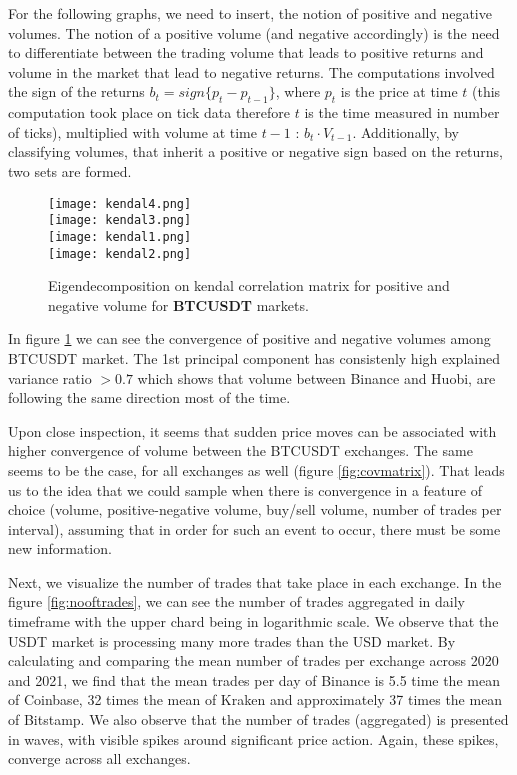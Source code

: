 For the following graphs, we need to insert, the notion of positive and negative volumes. The notion of a positive volume (and negative accordingly) is the need to differentiate between the trading volume that leads to positive returns and volume in the market that lead to negative returns. The computations involved the sign of the returns \(b_t = sign\{p_t - p_{t-1}\}\), where \(p_t\) is the price at time \(t\) (this computation took place on tick data therefore \(t\) is the time measured in number of ticks), multiplied with volume at time \(t-1\) : \(b_t \cdot V_{t-1}\). Additionally, by classifying volumes, that inherit a positive or negative sign based on the returns, two sets are formed. 

\begin{figure}[H]
	\centering
    \texttt{[image: kendal4.png]} \\
    \texttt{[image: kendal3.png]} \\ 
    \texttt{[image: kendal1.png]} \\
    \texttt{[image: kendal2.png]} \\
	\caption{Eigendecomposition on kendal correlation matrix for positive and negative volume for \textbf{BTCUSDT} markets.}
    \label{fig:pcakendall}
\end{figure}

In figure \ref{fig:pcakendall} we can see the convergence of positive and negative volumes among BTCUSDT market. The 1st principal component has consistenly high explained variance ratio \( > 0.7 \) which shows that volume between Binance and Huobi, are following the same direction most of the time.

Upon close inspection, it seems that sudden price moves can be associated with higher convergence of volume between the BTCUSDT exchanges. The same seems to be the case, for all exchanges as well (figure \ref{fig:covmatrix}). That leads us to the idea that we could sample when there is convergence in a feature of choice (volume, positive-negative volume, buy/sell volume, number of trades per interval), assuming that in order for such an event to occur, there must be some new information. 

Next, we visualize the number of trades that take place in each exchange. In the figure \ref{fig:nooftrades}, we can see the number of trades aggregated in daily timeframe with the upper chard being in logarithmic scale. We observe that the USDT market is processing many more trades than the USD market. By calculating and comparing the mean number of trades per exchange across 2020 and 2021, we find that the mean trades per day of Binance is 5.5 time the mean of Coinbase, 32 times the mean of Kraken and approximately 37 times the mean of Bitstamp. We also observe that the number of trades (aggregated) is presented in waves, with visible spikes around significant price action. Again, these spikes, converge across all exchanges.  

